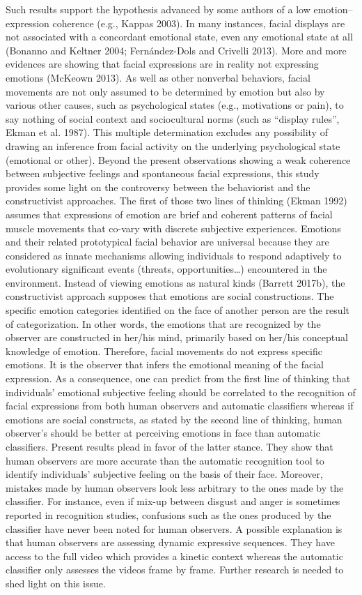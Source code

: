 \documentclass[conference,final,]{IEEEtran}
\begin{document}
Such results support the hypothesis advanced by some authors of a low
emotion--expression coherence (e.g., Kappas 2003). In many instances,
facial displays are not associated with a concordant emotional state,
even any emotional state at all (Bonanno and Keltner 2004;
Fernández-Dols and Crivelli 2013). More and more evidences are showing
that facial expressions are in reality not expressing emotions (McKeown
2013). As well as other nonverbal behaviors, facial movements are not
only assumed to be determined by emotion but also by various other
causes, such as psychological states (e.g., \nolinebreak motivations or
pain), to say nothing of social context and sociocultural norms (such as
``display rules'', Ekman et al. 1987). This multiple determination
excludes any possibility of drawing an inference from facial activity on
the underlying psychological state (emotional or other). Beyond the
present observations showing a weak coherence between subjective
feelings and spontaneous facial expressions, this study provides some
light on the controversy between the behaviorist and the constructivist
approaches. The first of those two lines of thinking (Ekman 1992)
assumes that expressions of emotion are brief and coherent patterns of
facial muscle movements that co-vary with discrete subjective
experiences. Emotions and their related prototypical facial behavior are
universal because they are considered as innate mechanisms allowing
individuals to respond adaptively to evolutionary significant events
(threats, opportunities\ldots{}) encountered in the environment. Instead
of viewing emotions as natural kinds (Barrett 2017b), the constructivist
approach supposes that emotions are social constructions. The specific
emotion categories identified on the face of another person are the
result of categorization. In other words, the emotions that are
recognized by the observer are constructed in her/his mind, primarily
based on her/his conceptual knowledge of emotion. Therefore, facial
movements do not express specific emotions. It is the observer that
infers the emotional meaning of the facial expression. As a consequence,
one can predict from the first line of thinking that individuals'
emotional subjective feeling should be correlated to the recognition of
facial expressions from both human observers and automatic classifiers
whereas if emotions are social constructs, as stated by the second line
of thinking, human observer's should be better at perceiving emotions in
face than automatic classifiers. Present results plead in favor of the
latter stance. They show that human observers are more accurate than the
automatic recognition tool to identify individuals' subjective feeling
on the basis of their face. Moreover, mistakes made by human observers
look less arbitrary to the ones made by the classifier. For instance,
even if mix-up between disgust and anger is sometimes reported in
recognition studies, confusions such as the ones produced by the
classifier have never been noted for human observers. A possible
explanation is that human observers are assessing dynamic expressive
sequences. They have access to the full video which provides a kinetic
context whereas the automatic classifier only assesses the videos frame
by frame. Further research is needed to shed light on this issue.
\end{document}
